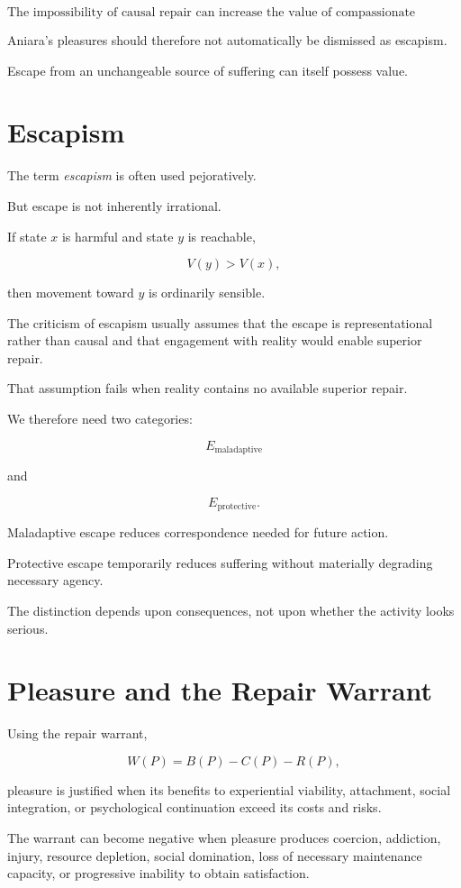 \documentclass[11pt,oneside]{book}
\theoremstyle{definition}
\theoremstyle{remark}
\begin{document}
\[
\boxed{
\text{The impossibility of causal repair can increase the value of compassionate symptomatic repair.}
}
\]

Aniara's pleasures should therefore not automatically be dismissed as escapism.

Escape from an unchangeable source of suffering can itself possess value.

\section{Escapism}

The term \emph{escapism} is often used pejoratively.

But escape is not inherently irrational.

If state \(x\) is harmful and state \(y\) is reachable,

\[
V(y)>V(x),
\]

then movement toward \(y\) is ordinarily sensible.

The criticism of escapism usually assumes that the escape is representational rather than causal and that engagement with reality would enable superior repair.

That assumption fails when reality contains no available superior repair.

We therefore need two categories:

\[
E_{\mathrm{maladaptive}}
\]

and

\[
E_{\mathrm{protective}}.
\]

Maladaptive escape reduces correspondence needed for future action.

Protective escape temporarily reduces suffering without materially degrading necessary agency.

The distinction depends upon consequences, not upon whether the activity looks serious.

\section{Pleasure and the Repair Warrant}

Using the repair warrant,

\[
W(P)
=
B(P)-C(P)-R(P),
\]

pleasure is justified when its benefits to experiential viability, attachment, social integration, or psychological continuation exceed its costs and risks.

The warrant can become negative when pleasure produces coercion, addiction, injury, resource depletion, social domination, loss of necessary maintenance capacity, or progressive inability to obtain satisfaction.
\end{document}
